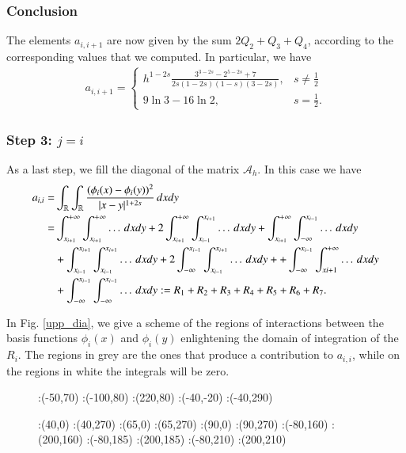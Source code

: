 {\subsubsection*{Conclusion}
The elements $a_{i,i+1}$ are now given by the sum $2Q_2+Q_3+Q_4$, according to the corresponding values that we computed. In particular, we have
\begin{align*}
	a_{i,i+1} = \begin{cases}
					\displaystyle h^{1-2s}\frac{3^{3-2s}-2^{5-2s}+7}{2s(1-2s)(1-s)(3-2s)}, & \displaystyle s\neq \frac{1}{2}
					\\
					9\ln 3-16\ln 2, & \displaystyle s=\frac{1}{2}.
				\end{cases}	
\end{align*}

\subsubsection*{Step 3: $j= i$}
As a last step, we fill the diagonal of the matrix $\mathcal A_h$. In this case we have
	\begin{align*}
	a_{i,i}= & \int_{\mathbb{R}}\int_{\mathbb{R}}\frac{(\phi_i(x)-\phi_i(y))^2}{|x-y|^{1+2s}}\,dxdy
	\\
	= & \int_{x_{i+1}}^{+\infty}\int_{x_{i+1}}^{+\infty} \ldots\,dxdy + 2\int_{x_{i+1}}^{+\infty}\int_{x_{i-1}}^{x_{i+1}} \ldots\,dxdy + \int_{x_{i+1}}^{+\infty}\int_{-\infty}^{x_{i-1}} \ldots\,dxdy 
	\\
	& + \int_{x_{i-1}}^{x_{i+1}}\int_{x_{i-1}}^{x_{i+1}} \ldots\,dxdy + 2\int_{-\infty}^{x_{i-1}}\int_{x_{i-1}}^{x_{i+1}} \ldots\,dxdy + + \int_{-\infty}^{x_{i-1}}\int_{x{i+1}}^{+\infty} \ldots\,dxdy 
	\\
	& +  \int_{-\infty}^{x_{i-1}}\int_{-\infty}^{x_{i-1}} \ldots\,dxdy := R_1 + R_2 + R_3 + R_4 + R_5 + R_6 + R_7.
\end{align*}

In Fig. \ref{upp_dia}, we give a scheme of the regions of interactions between the basis functions $\phi_i(x)$ and $\phi_i(y)$ enlightening the domain of integration of the $R_i$. The regions in grey are the ones that produce a contribution to $a_{i,i}$, while on the regions in white the integrals will be zero.
\begin{figure}
\figinit{0.7pt}
:(-50,70)
:(-100,80) :(220,80)
:(-40,-20) :(-40,290)

:(40,0) :(40,270)
:(65,0) :(65,270)
:(90,0) :(90,270)
%
:(-80,160) :(200,160)
:(-80,185) :(200,185)
:(-80,210) :(200,210)


\end{figure}}
